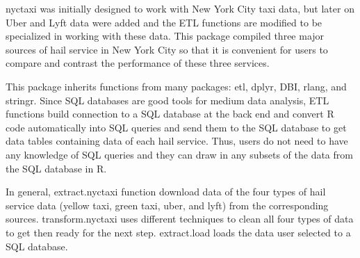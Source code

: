 \documentclass[12pt,twoside]{reedthesis}
\theoremstyle{definition}
\theoremstyle{definition}
\theoremstyle{definition}
\theoremstyle{remark}
\begin{document}
nyctaxi was initially designed to work with New York City taxi data, but
later on Uber and Lyft data were added and the ETL functions are
modified to be specialized in working with these data. This package
compiled three major sources of hail service in New York City so that it
is convenient for users to compare and contrast the performance of these
three services.

This package inherits functions from many packages: etl, dplyr, DBI,
rlang, and stringr. Since SQL databases are good tools for medium data
analysis, ETL functions build connection to a SQL database at the back
end and convert R code automatically into SQL queries and send them to
the SQL database to get data tables containing data of each hail
service. Thus, users do not need to have any knowledge of SQL queries
and they can draw in any subsets of the data from the SQL database in R.

In general, extract.nyctaxi function download data of the four types of
hail service data (yellow taxi, green taxi, uber, and lyft) from the
corresponding sources. transform.nyctaxi uses different techniques to
clean all four types of data to get then ready for the next step.
extract.load loads the data user selected to a SQL database.
\end{document}
